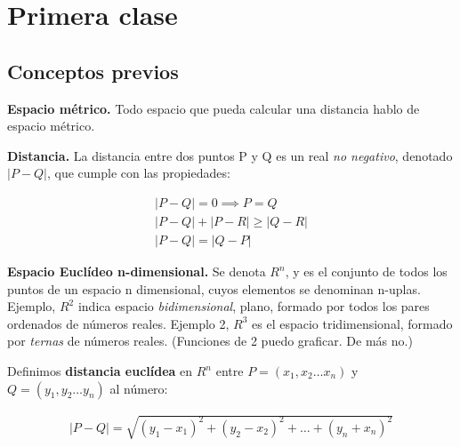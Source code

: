 \section{Primera clase}

\subsection{Conceptos previos}

\textbf{Espacio métrico.}
Todo espacio que pueda calcular una distancia hablo de espacio métrico.

\textbf{Distancia.}
La distancia entre dos puntos P y Q es un real \textit{no negativo},
denotado \(|P-Q|\),
que cumple con las propiedades:

\begin{align*}
    |P-Q| = 0 \implies P = Q \\
    |P-Q| + |P-R| \geq |Q-R| \\
    |P-Q| = |Q-P|  
\end{align*}

\textbf{Espacio Euclídeo n-dimensional.}
Se denota \(R^{n}\),
y es el conjunto de todos los puntos de un espacio n dimensional,
cuyos elementos se denominan n-uplas.
Ejemplo, \(R^{2}\) indica espacio \textit{bidimensional},
plano,
formado por todos los pares ordenados de números reales.
Ejemplo 2, \(R^{3}\) es el espacio tridimensional,
formado por \textit{ternas} de números reales.
(Funciones de 2 puedo graficar.
De más no.)

Definimos \textbf{distancia euclídea} en \(R^{n}\) 
entre \(P = (x_{1},x_2 \dots x_n)\) y \(Q = (y_{1},y_2 \dots y_n)\) al número:

\begin{align*}
    |P-Q| = \sqrt{(y_1 - x_1)^{2} + (y_2 - x_2)^{2} + \dots + (y_n + x_n)^{2}}
\end{align*}
